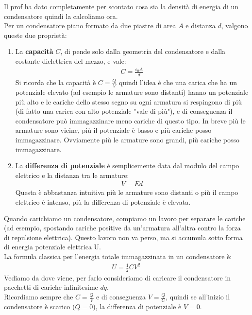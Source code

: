 \documentclass[a4paper, oneside]{article}
\begin{document}
\begin{aside}
    Il prof ha dato completamente per scontato cosa sia la densità di energia di un condensatore quindi la calcoliamo ora.\\
    Per un condensatore piano formato da due piastre di area $A$ e distanza $d$, valgono queste due proprietà:\\
    \begin{enumerate}
        \item La \textbf{capacità} $C$, di pende solo dalla geometria del condensatore e dalla costante dielettrica del mezzo, e vale:
        \begin{gather*}
            C = \frac{\varepsilon_0 A}{d}
        \end{gather*}
        Si ricorda che la capacità è $C = \frac{Q}{V}$ quindi l'idea è che una carica che ha un potenziale elevato (ad esempio le armature sono distanti) hanno un potenziale più alto e le cariche dello stesso segno su ogni armatura si respingono di più (di fatto una carica con alto potenziale "vale di più"), e di conseguenza il condensatore può immagazzinare meno cariche di questo tipo.
        In breve più le armature sono vicine, più il potenziale è basso e più cariche posso immagazzinare. Ovviamente più le armature sono grandi, più cariche posso immagazzinare.
        \item La \textbf{differenza di potenziale} è semplicemente data dal modulo del campo elettrico e la distanza tra le armature:
        \begin{gather*}
            V = E d
        \end{gather*}
        Questa è abbastanza intuitiva più le armature sono distanti o più il campo elettrico è intenso, più la differenza di potenziale è elevata.
    \end{enumerate}
    Quando carichiamo un condensatore, compiamo un lavoro per separare le cariche (ad esempio, spostando cariche positive da un'armatura all'altra contro la forza di repulsione elettrica). Questo lavoro non va perso, ma si accumula sotto forma di energia potenziale elettrica U.\\
    La formula classica per l'energia totale immagazzinata in un condensatore è:
    \begin{gather*}
        U = \frac{1}{2} C V^2
    \end{gather*}
    Vediamo da dove viene, per farlo consideriamo di caricare il condensatore in pacchetti di cariche infinitesime $dq$.\\
    Ricordiamo sempre che $C = \frac{Q}{V}$ e di conseguenza $V = \frac{Q}{C}$, quindi se all'inizio il condensatore è scarico ($Q=0$), la differenza di potenziale è $V=0$.\\

\end{aside}
\end{document}
